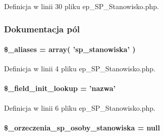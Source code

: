 Definicja w linii 30 pliku ep\-\_\-\-S\-P\-\_\-\-Stanowisko.\-php.



\subsubsection{Dokumentacja pól}
\hypertarget{classep___s_p___stanowisko_ab4e31d75f0bc5d512456911e5d01366b}{
\paragraph[{\$\-\_\-aliases}]{\setlength{\rightskip}{0pt plus 5cm}\$\-\_\-aliases = array( 'sp\-\_\-stanowiska' )}}\label{classep___s_p___stanowisko_ab4e31d75f0bc5d512456911e5d01366b}


Definicja w linii 4 pliku ep\-\_\-\-S\-P\-\_\-\-Stanowisko.\-php.

\hypertarget{classep___s_p___stanowisko_a4a4d54ae35428077a7c61ec8a5139af3}{
\paragraph[{\$\-\_\-field\-\_\-init\-\_\-lookup}]{\setlength{\rightskip}{0pt plus 5cm}\$\-\_\-field\-\_\-init\-\_\-lookup = 'nazwa'}}\label{classep___s_p___stanowisko_a4a4d54ae35428077a7c61ec8a5139af3}


Definicja w linii 6 pliku ep\-\_\-\-S\-P\-\_\-\-Stanowisko.\-php.

\hypertarget{classep___s_p___stanowisko_a96932ccc35af06bdee80dc8ce108397e}{
\paragraph[{\$\-\_\-orzeczenia\-\_\-sp\-\_\-osoby\-\_\-stanowiska}]{\setlength{\rightskip}{0pt plus 5cm}\$\-\_\-orzeczenia\-\_\-sp\-\_\-osoby\-\_\-stanowiska = null\hspace{0.3cm}{\ttfamily [protected]}}}\label{classep___s_p___stanowisko_a96932ccc35af06bdee80dc8ce108397e}


